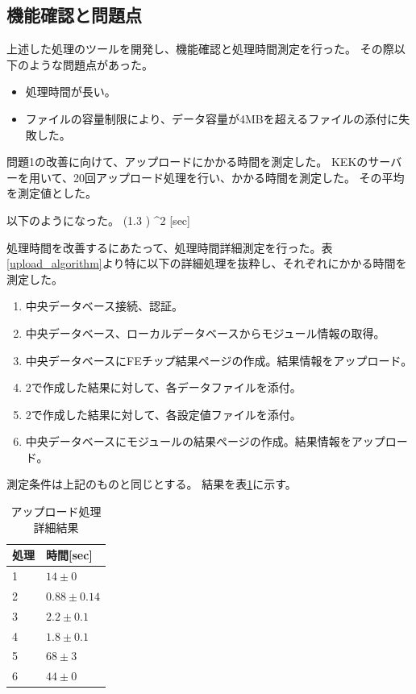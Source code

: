 \subsection{機能確認と問題点}
上述した処理のツールを開発し、機能確認と処理時間測定を行った。
その際以下のような問題点があった。
\begin{itemize}
  \item 処理時間が長い。
  \item ファイルの容量制限により、データ容量が4MBを超えるファイルの添付に失敗した。
\end{itemize}

問題1の改善に向けて、アップロードにかかる時間を測定した。
KEKのサーバーを用いて、20回アップロード処理を行い、かかる時間を測定した。
その平均を測定値とした。

以下のようになった。
\bbb
  (1.3 ) ^2 [{\rm sec}]
\eee

処理時間を改善するにあたって、処理時間詳細測定を行った。表\ref{upload_algorithm}より特に以下の詳細処理を抜粋し、それぞれにかかる時間を測定した。
\begin{enumerate}
  \item 中央データベース接続、認証。
  \item 中央データベース、ローカルデータベースからモジュール情報の取得。
  \item 中央データベースにFEチップ結果ページの作成。結果情報をアップロード。
  \item 2で作成した結果に対して、各データファイルを添付。
  \item 2で作成した結果に対して、各設定値ファイルを添付。
  \item 中央データベースにモジュールの結果ページの作成。結果情報をアップロード。
\end{enumerate}

測定条件は上記のものと同じとする。
結果を表\ref{upload_process_detail_result}に示す。
\begin{table}[tbp]
\begin{center}
\caption[アップロード処理詳細結果]{アップロード処理詳細結果}
\label{upload_process_detail_result}
  \begin{tabular}{|ll|} \hline
    処理 & 時間[sec] \\ \hline
    1 & $ 14 \pm 0 $ \\  
    2 & $ 0.88 \pm 0.14 $ \\  
    3 & $ 2.2 \pm  0.1 $ \\  
    4 & $ 1.8 \pm 0.1 $ \\  
    5 & $ 68 \pm 3 $ \\  
    6 & $ 44 \pm 0 $ \\ \hline 
  \end{tabular}
\end{center}
\end{table}

